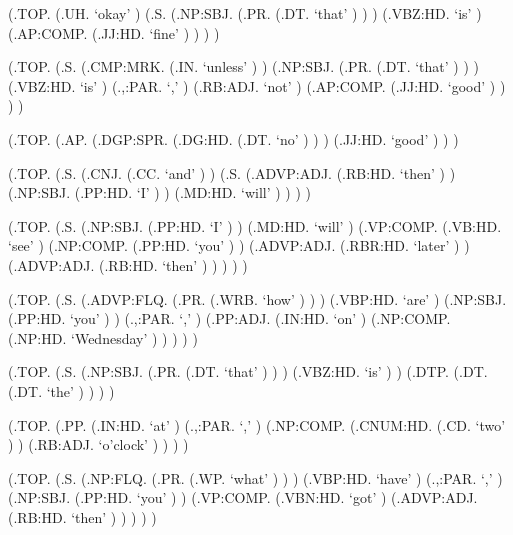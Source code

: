 \documentclass[10pt]{article}
\begin{document}
\begin{parsetree}  (.TOP. (.UH. `okay' ) (.S. (.NP:SBJ. (.PR. (.DT. `that' ) ) ) (.VBZ:HD. `is' ) (.AP:COMP. (.JJ:HD. `fine' ) ) ) ) \end{parsetree}

\begin{parsetree}  (.TOP. (.S. (.CMP:MRK. (.IN. `unless' ) ) (.NP:SBJ. (.PR. (.DT. `that' ) ) ) (.VBZ:HD. `is' ) (.,:PAR. `,' ) (.RB:ADJ. `not' ) (.AP:COMP. (.JJ:HD. `good' ) ) ) ) \end{parsetree}

\begin{parsetree}  (.TOP. (.AP. (.DGP:SPR. (.DG:HD. (.DT. `no' ) ) ) (.JJ:HD. `good' ) ) ) \end{parsetree}

\begin{parsetree}  (.TOP. (.S. (.CNJ. (.CC. `and' ) ) (.S. (.ADVP:ADJ. (.RB:HD. `then' ) ) (.NP:SBJ. (.PP:HD. `I' ) ) (.MD:HD. `will' ) ) ) ) \end{parsetree}

\begin{parsetree}  (.TOP. (.S. (.NP:SBJ. (.PP:HD. `I' ) ) (.MD:HD. `will' ) (.VP:COMP. (.VB:HD. `see' ) (.NP:COMP. (.PP:HD. `you' ) ) (.ADVP:ADJ. (.RBR:HD. `later' ) ) (.ADVP:ADJ. (.RB:HD. `then' ) ) ) ) ) \end{parsetree}

\begin{parsetree}  (.TOP. (.S. (.ADVP:FLQ. (.PR. (.WRB. `how' ) ) ) (.VBP:HD. `are' ) (.NP:SBJ. (.PP:HD. `you' ) ) (.,:PAR. `,' ) (.PP:ADJ. (.IN:HD. `on' ) (.NP:COMP. (.NP:HD. `Wednesday' ) ) ) ) ) \end{parsetree}

\begin{parsetree}  (.TOP. (.S. (.NP:SBJ. (.PR. (.DT. `that' ) ) ) (.VBZ:HD. `is' ) ) (.DTP. (.DT. (.DT. `the' ) ) ) ) \end{parsetree}

\begin{parsetree}  (.TOP. (.PP. (.IN:HD. `at' ) (.,:PAR. `,' ) (.NP:COMP. (.CNUM:HD. (.CD. `two' ) ) (.RB:ADJ. `o'clock' ) ) ) ) \end{parsetree}

\begin{parsetree}  (.TOP. (.S. (.NP:FLQ. (.PR. (.WP. `what' ) ) ) (.VBP:HD. `have' ) (.,:PAR. `,' ) (.NP:SBJ. (.PP:HD. `you' ) ) (.VP:COMP. (.VBN:HD. `got' ) (.ADVP:ADJ. (.RB:HD. `then' ) ) ) ) ) \end{parsetree}
\end{document}

